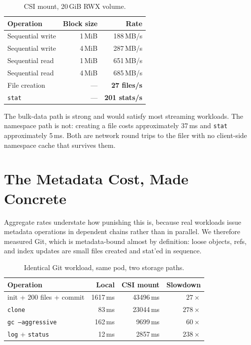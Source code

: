 \documentclass[11pt]{article}
\begin{document}
\begin{table}[h]
\centering
\begin{tabular}{lrr}
\toprule
Operation & Block size & Rate \\
\midrule
Sequential write & 1\,MiB & 188\,MB/s \\
Sequential write & 4\,MiB & 287\,MB/s \\
Sequential read  & 1\,MiB & 651\,MB/s \\
Sequential read  & 4\,MiB & 685\,MB/s \\
\midrule
File creation & --- & \textbf{27 files/s} \\
\texttt{stat} & --- & \textbf{201 stats/s} \\
\bottomrule
\end{tabular}
\caption{CSI mount, 20\,GiB RWX volume.}
\end{table}

The bulk-data path is strong and would satisfy most streaming workloads. The
namespace path is not: creating a file costs approximately 37\,ms and
\texttt{stat} approximately 5\,ms. Both are network round trips to the
filer with no client-side namespace cache that survives them.

\section{The Metadata Cost, Made Concrete}

Aggregate rates understate how punishing this is, because real workloads
issue metadata operations in dependent chains rather than in parallel. We
therefore measured Git, which is metadata-bound almost by definition: loose
objects, refs, and index updates are small files created and stat'ed in
sequence.

\begin{table}[h]
\centering
\begin{tabular}{lrrr}
\toprule
Operation & Local & CSI mount & Slowdown \\
\midrule
init + 200 files + commit & 1617\,ms & 43496\,ms & \(27\times\) \\
\texttt{clone}            & 83\,ms   & 23044\,ms & \(278\times\) \\
\texttt{gc --aggressive}  & 162\,ms  & 9699\,ms  & \(60\times\) \\
\texttt{log} + \texttt{status} & 12\,ms & 2857\,ms & \(238\times\) \\
\bottomrule
\end{tabular}
\caption{Identical Git workload, same pod, two storage paths.}
\end{table}
\end{document}
